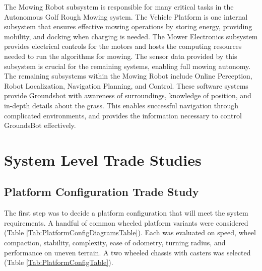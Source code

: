 \documentclass[12pt]{extarticle}
\begin{document}
  The Mowing Robot subsystem is responsible for many critical tasks in the Autonomous Golf Rough Mowing system. The Vehicle Platform is one internal subsystem that ensures effective mowing operations by storing energy, providing mobility, and docking when charging is needed. The Mower Electronics subsystem provides electrical controls for the motors and hosts the computing resources needed to run the algorithms for mowing. The sensor data provided by this subsystem is crucial for the remaining systems, enabling full mowing autonomy.\\
  
  The remaining subsystems within the Mowing Robot include Online Perception, Robot Localization, Navigation Planning, and Control. These software systems provide Groundsbot with awareness of surroundings, knowledge of position, and in-depth details about the grass. This enables successful navigation through complicated environments, and provides the information necessary to control GroundsBot effectively.\\

\newpage
\section{System Level Trade Studies}
  \subsection{Platform Configuration Trade Study}
The first step was to decide a platform configuration that will meet the system requirements. A handful of common wheeled platform variants were considered (Table \ref{Tab:PlatformConfigDiagramsTable}). Each was evaluated on speed, wheel compaction, stability, complexity, ease of odometry, turning radius, and performance on uneven terrain. A two wheeled chassis with casters was selected (Table \ref{Tab:PlatformConfigTable}).
\end{document}
